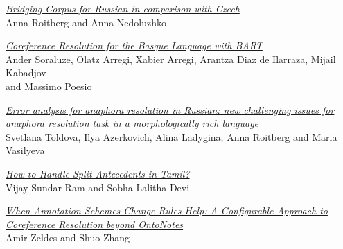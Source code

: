 \hyperlink{page.59}{\em Bridging Corpus for Russian in comparison with Czech}\samepage \\
\hspace*{7mm} Anna Roitberg and Anna Nedoluzhko\dotfill {}

\hyperlink{page.67}{\em Coreference Resolution for the Basque Language with BART}\samepage \\
\hspace*{7mm} Ander Soraluze, Olatz Arregi, Xabier Arregi, Arantza Diaz de Ilarraza, Mijail Kabadjov\\
\hspace*{7mm} and Massimo Poesio\dotfill {}

\hyperlink{page.74}{\em Error analysis for anaphora resolution in Russian: new challenging issues for anaphora resolution task in a morphologically rich language}\samepage \\
\hspace*{7mm} Svetlana Toldova, Ilya Azerkovich, Alina Ladygina, Anna Roitberg and Maria Vasilyeva\dotfill {}

\hyperlink{page.84}{\em How to Handle Split Antecedents in Tamil?}\samepage \\
\hspace*{7mm} Vijay Sundar Ram and Sobha Lalitha Devi\dotfill {}

\hyperlink{page.92}{\em When Annotation Schemes Change Rules Help:  A Configurable Approach to Coreference Resolution beyond OntoNotes}\samepage \\
\hspace*{7mm} Amir Zeldes and Shuo Zhang\dotfill {}
